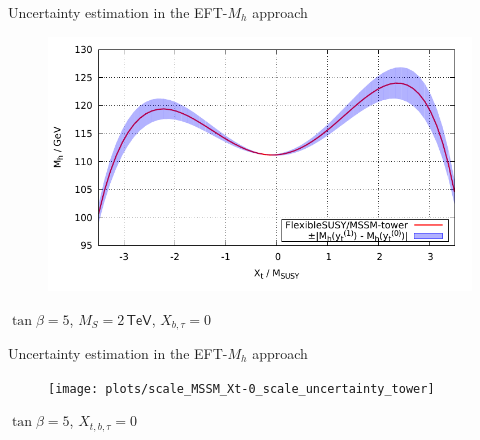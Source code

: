 \documentclass[hyperref={pdfpagelabels=false},ngerman]{beamer}
\newcommand{\eh}[1]{\,\mathsf{#1}}
\begin{document}



\begin{frame}{Uncertainty estimation in the EFT-$M_h$ approach}
  \begin{figure}
    \centering
    \includegraphics[width=\textwidth]{plots/xt_MSSM_MS-2000_tower}
  \end{figure}
  $\tan\beta = 5$, $M_S = 2\eh{TeV}$, $X_{b,\tau} = 0$
\end{frame}

\begin{frame}{Uncertainty estimation in the EFT-$M_h$ approach}
  \begin{figure}
    \centering
    \texttt{[image: plots/scale\_MSSM\_Xt-0\_scale\_uncertainty\_tower]}
  \end{figure}
  $\tan\beta = 5$, $X_{t,b,\tau} = 0$
\end{frame}
\end{document}
